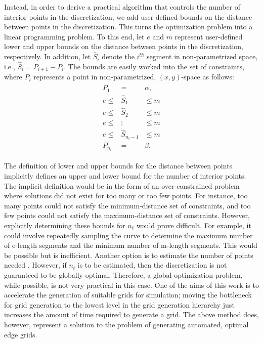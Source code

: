 Instead, in order to derive a practical algorithm that controls the 
number of interior points in the discretization, we add user-defined 
bounds on the distance between points in the discretization.  This turns 
the optimization problem into a linear programming problem.  To this end, 
let $e$ and $m$ represent user-defined lower and upper bounds on the 
distance between points in the discretization, 
respectively.  In addition, let $\hat{S}_i$ denote the $i^{th}$ segment 
in non-parametrized space, i.e., $\hat{S}_i = P_{i+1}-P_i$.  The bounds 
are easily worked into the set of constraints, where $P_i$ represents a 
point in non-parametrized, $(x,y)$-space as follows: 
\begin{eqnarray*} 
\begin{array}{rcl} 
P_1 & = & \alpha,\\ 
e \leq & \hat{S}_1 & \leq m \\ 
e \leq & \hat{S}_2 & \leq m \\ 
e \leq & \vdots & \leq m \\ 
e \leq & \hat{S}_{n_t-1} & \leq m \\ 
P_{n_t} & = & \beta. 
\end{array} 
\end{eqnarray*}

The definition of lower and upper bounds for the distance between points 
implicitly defines an upper and lower bound for the number of interior 
points. The implicit definition would be in the form of an 
over-constrained problem where solutions did not exist for too many or too 
few points. For instance, too many points could not satisfy the 
minimum-distance set of constraints, and too few points could not satisfy 
the maximum-distance set of constraints. However, explicitly determining 
these bounds for $n_t$ would prove difficult. For example, it could 
involve repeatedly sampling the curve to determine the maximum number of 
e-length segments and the minimum number of m-length segments. This would 
be possible but is inefficient. Another option is to estimate the number 
of points needed \cite{cuilliere97}. However, if $n_t$ is to be estimated, 
then the discretization is not guaranteed to be globally optimal. Therefore, 
a global optimization problem, while possible, is not 
very practical in this case. One of the aims of this work is to 
accelerate the generation of suitable grids for simulation; moving the 
bottleneck for grid generation to the lowest level in the grid generation 
hierarchy just increases the amount of time required to generate a grid. 
The above method does, however, represent a solution to the problem of 
generating automated, optimal edge grids.

